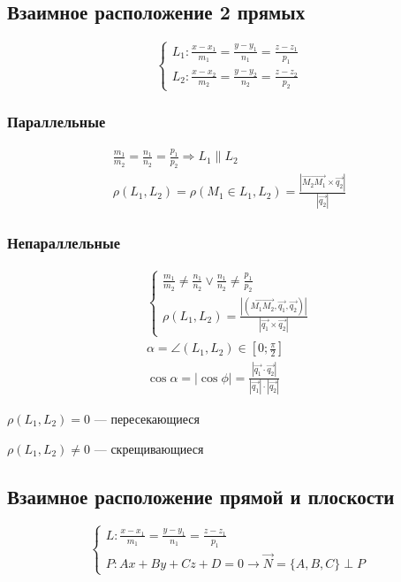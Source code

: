 \documentclass{article}
\begin{document}
\subsection{Взаимное расположение 2 прямых}

\[
	\begin{cases}
		L_1: \frac{x - x_1}{m_1} = \frac{y - y_1}{n_1} = \frac{z - z_1}{p_1} \\
		L_2: \frac{x - x_2}{m_2} = \frac{y - y_2}{n_2} = \frac{z - z_2}{p_2}
	\end{cases}
\]

\subsubsection{Параллельные}

\begin{gather*}
	\frac{m_1}{m_2} = \frac{n_1}{n_2} = \frac{p_1}{p_2} \Rightarrow L_1 \parallel L_2 \\
	\rho(L_1, L_2) = \rho(M_1 \in L_1, L_2) = \frac{|\vec{M_2 M_1} \times \vec{q_2}|}{|\vec{q_2}|}
\end{gather*}

\subsubsection{Непараллельные}

\begin{gather*}
	\begin{cases}
		\frac{m_1}{m_2} \ne \frac{n_1}{n_2} \lor \frac{n_1}{n_2} \ne \frac{p_1}{p_2} \\
		\rho(L_1, L_2) = \frac{|(\vec{M_1 M_2}, \vec{q_1}, \vec{q_2})|}{|\vec{q_1} \times \vec{q_2}|}
	\end{cases} \\
	\alpha = \angle(L_1, L_2) \in [0; \frac{\pi}{2}] \\
	\cos \alpha = |\cos \phi| = \frac{|\vec{q_1} \cdot \vec{q_2}|}{|\vec{q_1}| \cdot |\vec{q_2}|}
\end{gather*}

$\rho(L_1, L_2) = 0$ --- пересекающиеся

$\rho(L_1, L_2) \ne 0$ --- скрещивающиеся

\subsection{Взаимное расположение прямой и плоскости}

\[
	\begin{cases}
		L: \frac{x - x_1}{m_1} = \frac{y - y_1}{n_1} = \frac{z - z_1}{p_1} \\
		P: Ax + By + Cz + D = 0 \rightarrow \vec{N} = \{ A, B, C \} \perp P
	\end{cases}
\]
\end{document}

